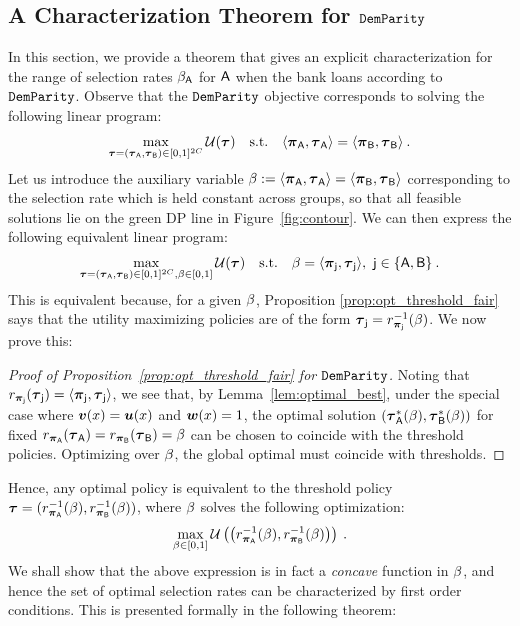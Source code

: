	\subsection{A Characterization Theorem for $\mathtt{DemParity}$}\label{sec:dem_par_proof}
		In this section, we provide a theorem that gives an explicit characterization for the range of selection rates $\beta_{\mathsf{A}}$ for $\mathsf{A}$ when the bank loans according to $\mathtt{DemParity}$. 
		Observe that the $\mathtt{DemParity}$ objective corresponds to solving the following linear program:
		\begin{eqnarray*}\label{eq:hard_const_dempar}
		\max_{\boldsymbol{\tau} = (\boldsymbol{\tau}_{\mathsf{A}},\boldsymbol{\tau}_{\mathsf{B}}) \in [0,1]^{2C}}\mathcal{U}(\boldsymbol{\tau}) \quad \mathrm{s.t.} \quad \langle \boldsymbol{\pi}_{\mathsf{A}}, \boldsymbol{\tau}_{\mathsf{A}} \rangle = \langle \boldsymbol{\pi}_{\mathsf{B}}, \boldsymbol{\tau}_{\mathsf{B}} \rangle \:.
		\end{eqnarray*}
		Let us introduce the auxiliary variable $\beta := \langle \boldsymbol{\pi}_{\mathsf{A}}, \boldsymbol{\tau}_{\mathsf{A}} \rangle = \langle \boldsymbol{\pi}_{\mathsf{B}}, \boldsymbol{\tau}_{\mathsf{B}} \rangle$ corresponding to the selection rate which is held constant across groups, so that all feasible solutions lie on the green DP line in Figure~\ref{fig:contour}. We can then express the following equivalent linear program:
		\begin{eqnarray*}\label{eq:hard_const_dempar_subst}
		\max_{\boldsymbol{\tau} = (\boldsymbol{\tau}_{\mathsf{A}},\boldsymbol{\tau}_{\mathsf{B}}) \in [0,1]^{2C},\beta \in [0,1]}\mathcal{U}(\boldsymbol{\tau}) \quad \mathrm{s.t.} \quad \beta = \langle \boldsymbol{\pi}_{\mathsf{j}}, \boldsymbol{\tau}_{\mathsf{j}} \rangle,~ \mathsf{j} \in \{\mathsf{A},\mathsf{B}\}\:.
		\end{eqnarray*}
		This is equivalent because, for a given $\beta$, Proposition \ref{prop:opt_threshold_fair} says that the utility maximizing policies are of the form $\boldsymbol{\tau}_{\mathsf{j}} = r_{\boldsymbol{\pi}_{\mathsf{j}}}^{-1}(\beta)$. We now prove this:
		
		\begin{proof}[Proof of Proposition~\ref{prop:opt_threshold_fair} for $\mathtt{DemParity}$] 
				Noting that $r_{\boldsymbol{\pi}_{\mathsf{j}}}(\boldsymbol{\tau}_{\mathsf{j}}) = \langle \boldsymbol{\pi}_{\mathsf{j}} , \boldsymbol{\tau}_{\mathsf{j}} \rangle$, we see that, by Lemma~\ref{lem:optimal_best}, under the special case where $\boldsymbol{v}(x) = \boldsymbol{u}(x)$ and $\boldsymbol{w}(x) = 1$, the optimal solution $(\boldsymbol{\tau}_{\mathsf{A}}^*(\beta),\boldsymbol{\tau}_{\mathsf{B}}^*(\beta))$ for fixed $r_{\boldsymbol{\pi}_{\mathsf{A}}}(\boldsymbol{\tau}_{\mathsf{A}}) = r_{\boldsymbol{\pi}_{\mathsf{B}}}(\boldsymbol{\tau}_{\mathsf{B}}) = \beta$ can be chosen to coincide with the threshold policies. Optimizing over $\beta$, the global optimal must coincide with thresholds. 
				
		\end{proof}
		
		
			
		
		Hence, any optimal policy is equivalent to the threshold policy $\boldsymbol{\tau} = (r_{\boldsymbol{\pi}_{\mathsf{A}}}^{-1}(\beta),r_{\boldsymbol{\pi}_{\mathsf{B}}}^{-1}(\beta))$, where $\beta$ solves the following optimization:
		\begin{eqnarray}\label{eq:hard_const_dempar_accrate}
		\max_{\beta \in [0,1]}\mathcal{U}\left(\left(r_{\boldsymbol{\pi}_{\mathsf{A}}}^{-1}(\beta),r_{\boldsymbol{\pi}_{\mathsf{B}}}^{-1}(\beta)\right)\right) \:.
		\end{eqnarray}
		We shall show that the above expression is in fact a \emph{concave} function in $\beta$, and hence the set of optimal selection rates can be characterized by first order conditions. This is presented formally in the following theorem:

